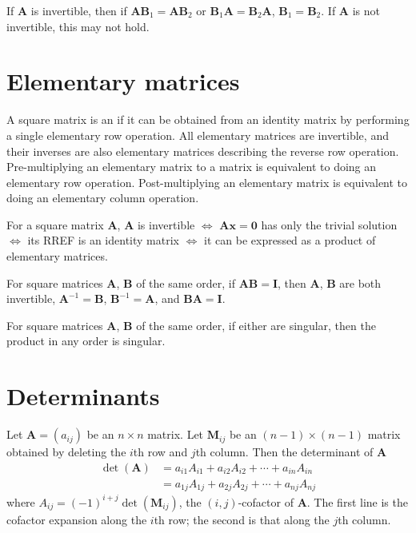 \documentclass{slnotes}
\begin{document}
If \(\mathbf{A}\) is invertible, then if \(\mathbf{AB}_1 = \mathbf{AB}_2\) or \(\mathbf{B}_1\mathbf{A} = \mathbf{B}_2\mathbf{A}\), \(\mathbf{B}_1 = \mathbf{B}_2\). If \(\mathbf{A}\) is not invertible, this may not hold.

\chapter{Elementary matrices}
A square matrix is an  if it can be obtained from an identity matrix by performing a single elementary row operation. All elementary matrices are invertible, and their inverses are also elementary matrices describing the reverse row operation. Pre-multiplying an elementary matrix to a matrix is equivalent to doing an elementary row operation. Post-multiplying an elementary matrix is equivalent to doing an elementary column operation.

For a square matrix \(\mathbf{A}\), \(\mathbf{A}\) is invertible \(\Leftrightarrow\) \(\mathbf{Ax} = \mathbf{0}\) has only the trivial solution \(\Leftrightarrow\) its RREF is an identity matrix \(\Leftrightarrow\) it can be expressed as a product of elementary matrices.

For square matrices \(\mathbf{A}\), \(\mathbf{B}\) of the same order, if \(\mathbf{AB} = \mathbf{I}\), then \(\mathbf{A}\), \(\mathbf{B}\) are both invertible, \(\mathbf{A}^{-1} = \mathbf{B}\), \(\mathbf{B}^{-1} = \mathbf{A}\), and \(\mathbf{BA} = \mathbf{I}\).

For square matrices \(\mathbf{A}\), \(\mathbf{B}\) of the same order, if either are singular, then the product in any order is singular.

\chapter{Determinants}
Let \(\mathbf{A} = (a_{ij})\) be an \(n \times n\) matrix. Let \(\mathbf{M}_{ij}\) be an \((n-1) \times (n-1)\) matrix obtained by deleting the \(i\)th row and \(j\)th column. Then the determinant of \(\mathbf{A}\)
\begin{align*}
\det(\mathbf{A}) &= a_{i1}A_{i1} + a_{i2}A_{i2} + \cdots + a_{in}A_{in}\\
&= a_{1j}A_{1j} + a_{2j}A_{2j} + \cdots + a_{nj}A_{nj}
\end{align*}
where \(A_{ij} = (-1)^{i+j}\det(\mathbf{M}_{ij})\), the \((i,j)\)-cofactor of \(\mathbf{A}\). The first line is the cofactor expansion along the \(i\)th row; the second is that along the \(j\)th column.
\end{document}

